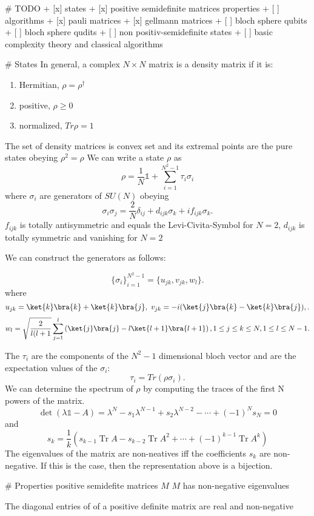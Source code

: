 # TODO
+ [x] states
+ [x] positive semidefinite matrices properties
+ [ ] algorithms
+ [x] pauli matrices
+ [x] gellmann matrices
+ [ ] bloch sphere qubits
+ [ ] bloch sphere qudits
+ [ ] non positiv-semidefinite states
+ [ ] basic complexity theory and classical algorithms

# States
In general, a complex $N \times N$ matrix is a density matrix if it is:
\begin{enumerate}[label=(\roman*)]
	\item Hermitian,	$\rho =\rho^{\dagger}$
	\item positive,		$\rho \ge 0$
	\item normalized,	$Tr\rho = 1$
\end{enumerate}
The set of density matrices is convex set and its extremal points are the pure states obeying $\rho^2 = \rho$
We can write a state $\rho$ as
$$\rho = \frac{1}{N} \mathbb{1} + \sum_{i=1}^{N^2-1} \tau_i \sigma_i$$
where $\sigma_i$ are generators of $SU(N)$ obeying
\[
	\sigma_i\sigma_j = \frac{2}{N}\delta_{ij} + d_{ijk}\sigma_k + if_{ijk}\sigma_k
.\]
$f_{ijk}$ is totally antisymmetric and equals the Levi-Civita-Symbol for $N=2$, $d_{ijk}$ is totally symmetric and vanishing for $N=2$

We can construct the generators as follows:

 \[
\{\sigma_i\}^{N^2-1}_{i=1} = \{u_{jk},v_{jk},w_l\}
.\]
where
\[
	u_{jk} = \ket{k}\bra{k}+\ket{k}\bra{j}, ~ v_{jk} = -i(\ket{j}\bra{k}-\ket{k}\bra{j}),
.\]
\[
	w_l = \sqrt{\frac{2}{l(l+1}} \sum_{j=1}^{l} \left( \ket{j}\bra{j}-l\ket{l+1}\bra{l+1} \right),
	1\le j\le k\le N, 1\le l\le N-1
.\]

The $\tau_i$ are the components of the $N^2-1$ dimensional bloch vector and are the expectation values of the $\sigma_i$:
 \[
	 \tau_i = Tr(\rho\sigma_i)
.\]
We can determine the spectrum of $\rho$ by computing the traces of the first N powers of the matrix.
$$\operatorname{det}(\lambda \mathbb{1}-A)=\lambda^{N}-s_{1} \lambda^{N-1}+s_{2} \lambda^{N-2}-\cdots+(-1)^{N} s_{N}=0$$
and
$$s_{k}=\frac{1}{k}\left(s_{k-1} \operatorname{Tr} A-s_{k-2} \operatorname{Tr} A^{2}+\cdots+(-1)^{k-1} \operatorname{Tr} A^{k}\right)$$
The eigenvalues of the matrix are non-neatives iff the coefficients $s_k$ are non-negative.
If this is the case, then the representation above is a bijection.



# Properties positive semidefite matrices $M$
$M$ has non-negative eigenvalues

The diagonal entries of of a positive definite matrix are real and non-negative


